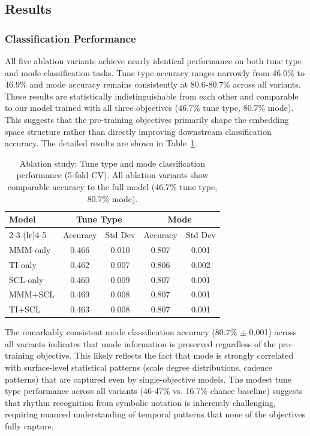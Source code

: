 \documentclass[]{interact}
\theoremstyle{plain}
\theoremstyle{definition}
\theoremstyle{remark}
\begin{document}
\subsection{Results}

\subsubsection{Classification Performance}

All five ablation variants achieve nearly identical performance on both tune type and mode classification tasks. Tune type accuracy ranges narrowly from 46.0\% to 46.9\% and mode accuracy remains consistently at 80.6-80.7\% across all variants. These results are statistically indistinguishable from each other and comparable to our model trained with all three objectives (46.7\% tune type, 80.7\% mode). This suggests that the pre-training objectives primarily shape the embedding space structure rather than directly improving downstream classification accuracy. The detailed results are shown in Table~\ref{tab:ablation_classification}.

\begin{table}[H]
\centering
\caption{Ablation study: Tune type and mode classification performance (5-fold CV). All ablation variants show comparable accuracy to the full model (46.7\% tune type, 80.7\% mode).}
\label{tab:ablation_classification}
\begin{tabular}{lcccc}
\toprule
\textbf{Model} & \multicolumn{2}{c}{\textbf{Tune Type}} & \multicolumn{2}{c}{\textbf{Mode}} \\
\cmidrule(lr){2-3} \cmidrule(lr){4-5}
 & Accuracy & Std Dev & Accuracy & Std Dev \\
\midrule
MMM-only & 0.466 & 0.010 & 0.807 & 0.001 \\
TI-only & 0.462 & 0.007 & 0.806 & 0.002 \\
SCL-only & 0.460 & 0.009 & 0.807 & 0.001 \\
MMM+SCL & 0.469 & 0.008 & 0.807 & 0.001 \\
TI+SCL & 0.463 & 0.008 & 0.807 & 0.001 \\
\bottomrule
\end{tabular}
\end{table}

The remarkably consistent mode classification accuracy (80.7\% $\pm$ 0.001) across all variants indicates that mode information is preserved regardless of the pre-training objective. This likely reflects the fact that mode is strongly correlated with surface-level statistical patterns (scale degree distributions, cadence patterns) that are captured even by single-objective models. The modest tune type performance across all variants (46-47\% vs. 16.7\% chance baseline) suggests that rhythm recognition from symbolic notation is inherently challenging, requiring nuanced understanding of temporal patterns that none of the objectives fully capture.
\end{document}
